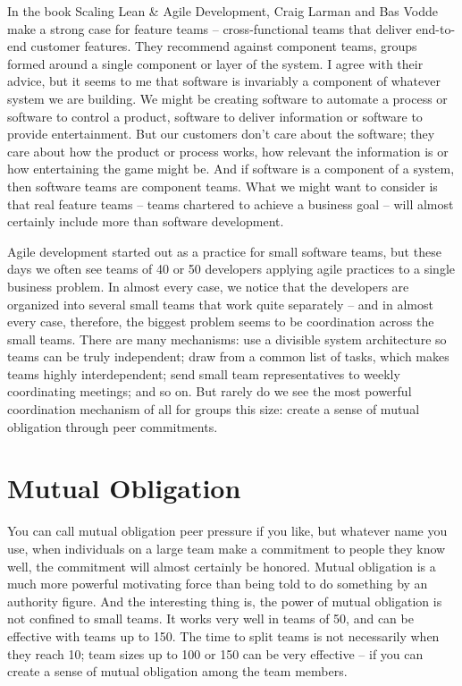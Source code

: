 In the book Scaling Lean \& Agile Development, Craig Larman and Bas Vodde make a strong case for feature teams – cross-functional teams that deliver end-to-end customer features. They recommend against component teams, groups formed around a single component or layer of the system. I agree with their advice, but it seems to me that software is invariably a component of whatever system we are building. We might be creating software to automate a process or software to control a product, software to deliver information or software to provide entertainment. But our customers don’t care about the software; they care about how the product or process works, how relevant the information is or how entertaining the game might be. And if software is a component of a system, then software teams are component teams. What we might want to consider is that real feature teams – teams chartered to achieve a business goal – will almost certainly include more than software development.


Agile development started out as a practice for small software teams, but these days we often see teams of 40 or 50 developers applying agile practices to a single business problem. In almost every case, we notice that the developers are organized into several small teams that work quite separately – and in almost every case, therefore, the biggest problem seems to be coordination across the small teams. There are many mechanisms: use a divisible system architecture so teams can be truly independent; draw from a common list of tasks, which makes teams highly interdependent; send small team representatives to weekly coordinating meetings; and so on. But rarely do we see the most powerful coordination mechanism of all for groups this size: create a sense of mutual obligation through peer commitments.

\section{Mutual Obligation}

You can call mutual obligation peer pressure if you like, but whatever name you use, when individuals on a large team make a commitment to people they know well, the commitment will almost certainly be honored. Mutual obligation is a much more powerful motivating force than being told to do something by an authority figure. And the interesting thing is, the power of mutual obligation is not confined to small teams. It works very well in teams of 50, and can be effective with teams up to 150. The time to split teams is not necessarily when they reach 10; team sizes up to 100 or 150 can be very effective – if you can create a sense of mutual obligation among the team members.

